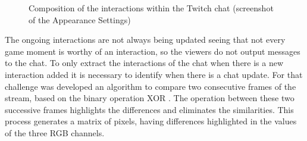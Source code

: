     \begin{figure}[htbp]
        \centering
        \fboxsep=0pt\fboxrule=0.5pt
        \caption{Composition of the interactions within the Twitch chat (screenshot of the Appearance Settings)}
        \label{fig:TwitchStreamChatSettings}
    \end{figure}



    The ongoing interactions are not always being updated seeing that not every game moment is worthy of an interaction, so the viewers do not output messages to the chat. To only extract the interactions of the chat when there is a new interaction added it is necessary to identify when there is a chat update. For that challenge was developed an algorithm to compare two consecutive frames of the stream, based on the binary operation XOR \cite{BitwiseOperationsOpenCV}. The operation between these two successive frames highlights the differences and eliminates the similarities. This process generates a matrix of pixels, having differences highlighted in the values of the three RGB channels.    

